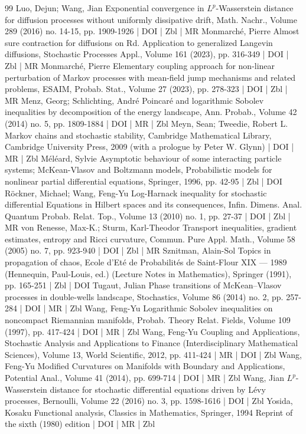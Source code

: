 \documentclass[10pt]{amsart}
\theoremstyle{definition}\newtheorem{defi}[theo]{Definition}\newtheorem{rema}[theo]{Remark}\newtheorem{exam}[theo]{Example}\newtheorem{exem}[theo]{Example}\newtheorem{nota}[theo]{Notation}
\newcommand{\1}{\mathbbm{1}}
\begin{document}
\begin{thebibliography}{99}
 Luo, Dejun; Wang, Jian Exponential convergence in ${L}^p$-Wasserstein distance for diffusion processes without uniformly dissipative drift, Math. Nachr., Volume 289 (2016) no. 14-15, pp. 1909-1926 | DOI | Zbl | MR
 Monmarché, Pierre Almost sure contraction for diffusions on Rd. Application to generalized Langevin diffusions, Stochastic Processes Appl., Volume 161 (2023), pp. 316-349 | DOI | Zbl | MR
 Monmarché, Pierre Elementary coupling approach for non-linear perturbation of Markov processes with mean-field jump mechanisms and related problems, ESAIM, Probab. Stat., Volume 27 (2023), pp. 278-323 | DOI | Zbl | MR
 Menz, Georg; Schlichting, André Poincaré and logarithmic Sobolev inequalities by decomposition of the energy landscape, Ann. Probab., Volume 42 (2014) no. 5, pp. 1809-1884 | DOI | MR | Zbl
 Meyn, Sean; Tweedie, Robert L. Markov chains and stochastic stability, Cambridge Mathematical Library, Cambridge University Press, 2009 (with a prologue by Peter W. Glynn) | DOI | MR | Zbl
 Méléard, Sylvie Asymptotic behaviour of some interacting particle systems; McKean-Vlasov and Boltzmann models, Probabilistic models for nonlinear partial differential equations, Springer, 1996, pp. 42-95 | Zbl | DOI
 Röckner, Michael; Wang, Feng-Yu Log-Harnack inequality for stochastic differential Equations in Hilbert spaces and its consequences, Infin. Dimens. Anal. Quantum Probab. Relat. Top., Volume 13 (2010) no. 1, pp. 27-37 | DOI | Zbl | MR
 von Renesse, Max-K.; Sturm, Karl-Theodor Transport inequalities, gradient estimates, entropy and Ricci curvature, Commun. Pure Appl. Math., Volume 58 (2005) no. 7, pp. 923-940 | DOI | Zbl | MR
 Sznitman, Alain-Sol Topics in propagation of chaos, Ecole d’Eté de Probabilités de Saint-Flour XIX — 1989 (Hennequin, Paul-Louis, ed.) (Lecture Notes in Mathematics), Springer (1991), pp. 165-251 | Zbl | DOI
 Tugaut, Julian Phase transitions of McKean–Vlasov processes in double-wells landscape, Stochastics, Volume 86 (2014) no. 2, pp. 257-284 | DOI | MR | Zbl
 Wang, Feng-Yu Logarithmic Sobolev inequalities on noncompact Riemannian manifolds, Probab. Theory Relat. Fields, Volume 109 (1997), pp. 417-424 | DOI | MR | Zbl
 Wang, Feng-Yu Coupling and Applications, Stochastic Analysis and Applications to Finance (Interdisciplinary Mathematical Sciences), Volume 13, World Scientific, 2012, pp. 411-424 | MR | DOI | Zbl
 Wang, Feng-Yu Modified Curvatures on Manifolds with Boundary and Applications, Potential Anal., Volume 41 (2014), pp. 699-714 | DOI | MR | Zbl
 Wang, Jian ${L}^p$-Wasserstein distance for stochastic differential equations driven by Lévy processes, Bernoulli, Volume 22 (2016) no. 3, pp. 1598-1616 | DOI | Zbl
 Yosida, Kosaku Functional analysis, Classics in Mathematics, Springer, 1994 Reprint of the sixth (1980) edition | DOI | MR | Zbl
\end{thebibliography}
\end{document}
